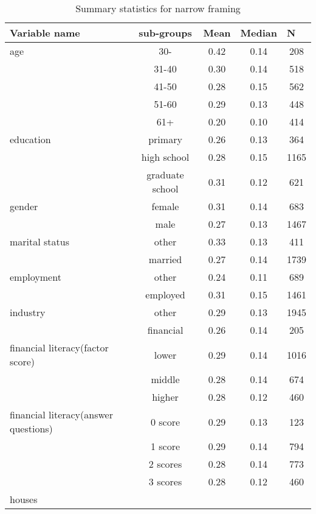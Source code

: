\documentclass[ukenglish,nottitlepage,thmsb,11pt,letterpaper]{article}
\begin{document}
\begin{spacing}{1}
\begin{table}[H]
	\renewcommand\arraystretch{1.5}%
	\centering
	\caption{Summary statistics for narrow framing}
	\small
	\begin{tabular*}{\textwidth}{l @{\extracolsep{\fill}} cccc}
		\toprule
		Variable name  &sub-groups  & \multicolumn{1}{l}{Mean}  & \multicolumn{1}{l}{Median}  & \multicolumn{1}{l}{N} \\
		\midrule
		age    
		        &30-      &0.42	&0.14	&208 \\
		        &31-40    &0.30	&0.14	&518 \\
		        &41-50    &0.28	&0.15	&562 \\
		        &51-60    &0.29	&0.13	&448 \\
		        &61+	  &0.20	&0.10	&414 \\
		\midrule
		education        
		    &primary             &0.26	&0.13	&364  \\
		    &high school         &0.28	&0.15	&1165 \\
		    &graduate school     &0.31	&0.12	&621  \\
		\midrule
		gender	
		&female          &0.31	&0.14 &683 \\        
		&male            &0.27	&0.13 &1467 \\
		\midrule    
		marital status
		&other       &0.33	&0.13 &411 \\
		&married     &0.27	&0.14 &1739 \\
		\midrule    
		employment
		&other       &0.24	&0.11	&689  \\
		&employed    &0.31	&0.15	&1461 \\
		\midrule    
		industry
		&other       &0.29	&0.13	&1945 \\
		&financial   &0.26	&0.14	&205 \\
		\midrule 
		financial literacy(factor score)
		&lower       &0.29	&0.14	&1016 \\
		&middle      &0.28	&0.14	&674  \\
		&higher      &0.28	&0.12	&460  \\
		\midrule	
		financial literacy(answer questions)
		&0 score     &0.29	&0.13	&123 \\
		&1 score     &0.29	&0.14	&794 \\
		&2 scores    &0.28	&0.14	&773 \\
		&3 scores    &0.28	&0.12	&460 \\
		\midrule
		houses	   

\end{tabular*}
\end{table}
\end{spacing}
\end{document}

